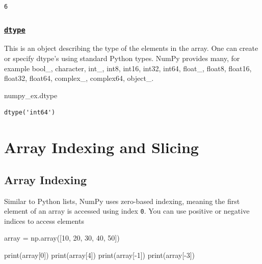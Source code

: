 \documentclass[
  letterpaper,
  DIV=11,
  numbers=noendperiod]{scrreprt}
\newenvironment{Shaded}{\begin{snugshade}}{\end{snugshade}}
\newcommand{\BuiltInTok}[1]{\textcolor[rgb]{0.00,0.23,0.31}{#1}}
\newcommand{\DecValTok}[1]{\textcolor[rgb]{0.68,0.00,0.00}{#1}}
\newcommand{\NormalTok}[1]{\textcolor[rgb]{0.00,0.23,0.31}{#1}}
\newcommand{\OperatorTok}[1]{\textcolor[rgb]{0.37,0.37,0.37}{#1}}
\begin{document}
\begin{verbatim}
6
\end{verbatim}

\hypertarget{dtype}{%
\subsubsection{\texorpdfstring{\href{https://numpy.org/doc/stable/reference/generated/numpy.ndarray.dtype.html}{\texttt{dtype}}}{dtype}}\label{dtype}}

This is an object describing the type of the elements in the array. One
can create or specify dtype's using standard Python types. NumPy
provides many, for example bool\_, character, int\_, int8, int16, int32,
int64, float\_, float8, float16, float32, float64, complex\_, complex64,
object\_.

\begin{Shaded}
\begin{Highlighting}[]
\NormalTok{numpy\_ex.dtype}
\end{Highlighting}
\end{Shaded}

\begin{verbatim}
dtype('int64')
\end{verbatim}

\hypertarget{array-indexing-and-slicing}{%
\section{Array Indexing and Slicing}\label{array-indexing-and-slicing}}

\hypertarget{array-indexing}{%
\subsection{Array Indexing}\label{array-indexing}}

Similar to Python lists, NumPy uses zero-based indexing, meaning the
first element of an array is accessed using index \texttt{0}. You can
use positive or negative indices to access elements

\begin{Shaded}
\begin{Highlighting}[]
\NormalTok{array }\OperatorTok{=}\NormalTok{ np.array([}\DecValTok{10}\NormalTok{, }\DecValTok{20}\NormalTok{, }\DecValTok{30}\NormalTok{, }\DecValTok{40}\NormalTok{, }\DecValTok{50}\NormalTok{])}

\BuiltInTok{print}\NormalTok{(array[}\DecValTok{0}\NormalTok{])  }
\BuiltInTok{print}\NormalTok{(array[}\DecValTok{4}\NormalTok{]) }
\BuiltInTok{print}\NormalTok{(array[}\OperatorTok{{-}}\DecValTok{1}\NormalTok{])  }
\BuiltInTok{print}\NormalTok{(array[}\OperatorTok{{-}}\DecValTok{3}\NormalTok{])  }
\end{Highlighting}
\end{Shaded}
\end{document}
